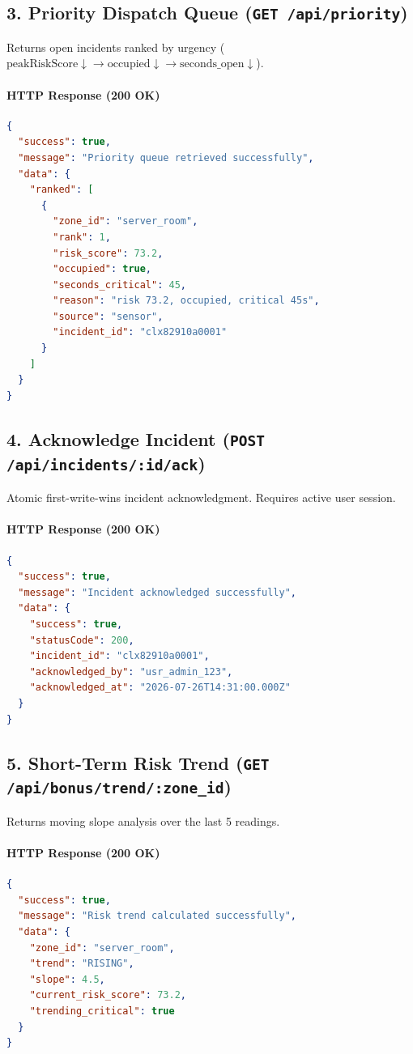 \documentclass[11pt,a4paper]{article}
\begin{document}
\subsection{3. Priority Dispatch Queue (\texttt{GET /api/priority})}
Returns open incidents ranked by urgency ($\text{peakRiskScore} \downarrow \rightarrow \text{occupied} \downarrow \rightarrow \text{seconds\_open} \downarrow$).

\paragraph{HTTP Response (200 OK)}
\begin{lstlisting}[language=json]
{
  "success": true,
  "message": "Priority queue retrieved successfully",
  "data": {
    "ranked": [
      {
        "zone_id": "server_room",
        "rank": 1,
        "risk_score": 73.2,
        "occupied": true,
        "seconds_critical": 45,
        "reason": "risk 73.2, occupied, critical 45s",
        "source": "sensor",
        "incident_id": "clx82910a0001"
      }
    ]
  }
}
\end{lstlisting}

\subsection{4. Acknowledge Incident (\texttt{POST /api/incidents/:id/ack})}
Atomic first-write-wins incident acknowledgment. Requires active user session.

\paragraph{HTTP Response (200 OK)}
\begin{lstlisting}[language=json]
{
  "success": true,
  "message": "Incident acknowledged successfully",
  "data": {
    "success": true,
    "statusCode": 200,
    "incident_id": "clx82910a0001",
    "acknowledged_by": "usr_admin_123",
    "acknowledged_at": "2026-07-26T14:31:00.000Z"
  }
}
\end{lstlisting}

\subsection{5. Short-Term Risk Trend (\texttt{GET /api/bonus/trend/:zone\_id})}
Returns moving slope analysis over the last 5 readings.

\paragraph{HTTP Response (200 OK)}
\begin{lstlisting}[language=json]
{
  "success": true,
  "message": "Risk trend calculated successfully",
  "data": {
    "zone_id": "server_room",
    "trend": "RISING",
    "slope": 4.5,
    "current_risk_score": 73.2,
    "trending_critical": true
  }
}
\end{lstlisting}
\end{document}
